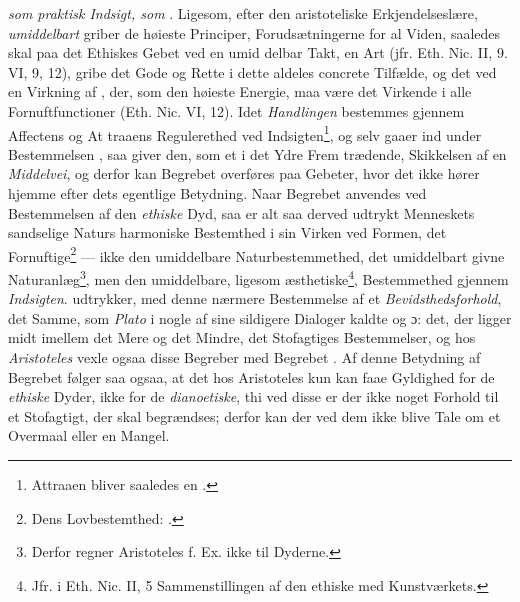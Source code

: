 \emph{} \emph{som praktisk Indsigt, som} \emph{}. Ligesom,
efter den aristoteliske Erkjendelseslære,  \emph{umiddelbart}
griber de høieste Principer, Forudsætningerne for al Viden,
saaledes skal paa det Ethiskes Gebet  ved en umid\-%
delbar Takt, en Art  (jfr. Eth. Nic. II, 9. VI, 9, 12),
gribe det Gode og Rette i dette aldeles concrete Tilfælde, og
det ved en Virkning af , der, som den høieste Energie,
maa være det Virkende i alle Fornuftfunctioner (Eth. Nic. VI,
12). Idet \emph{Handlingen} bestemmes gjennem Affectens og At\-%
traaens Regulerethed ved Indsigten\footnote{Attraaen bliver saaledes
en .}, og selv gaaer ind under
Bestemmelsen , saa giver den, som et i det Ydre Frem\-%
trædende,  Skikkelsen af en \emph{Middelvei}, og derfor
kan Begrebet  overføres paa Gebeter, hvor det ikke
hører hjemme efter dets egentlige Betydning. Naar Begrebet
anvendes ved Bestemmelsen af den \emph{ethiske} Dyd, saa er alt\-%
saa derved udtrykt Menneskets sandselige Naturs harmoniske
Bestemthed i sin Virken ved Formen, det Fornuftige\footnote{Dens
Lovbestemthed:  \emph{} .} --- ikke
den umiddelbare Naturbestemmethed, det umiddelbart givne
Naturanlæg\footnote{Derfor regner Aristoteles f. Ex. ikke
 til Dyderne.}, men den umiddelbare, ligesom æsthetiske\footnote{Jfr.
i Eth. Nic. II, 5 Sammenstillingen af den ethiske  med
Kunstværkets.},
Bestemmethed gjennem \emph{Indsigten}.  udtrykker, med
denne nærmere Bestemmelse af et \emph{Bevidsthedsforhold}, det
Samme, som \emph{Plato} i nogle af sine sildigere Dialoger kaldte
 og  ɔ: det, der ligger midt imellem det
Mere og det Mindre, det Stofagtiges Bestemmelser, og hos
\emph{Aristoteles} vexle ogsaa disse Begreber med Begrebet .
Af denne Betydning af Begrebet følger saa ogsaa, at det hos
Aristoteles kun kan faae Gyldighed for de \emph{ethiske} Dyder,
ikke for de \emph{dianoetiske}, thi ved disse er der ikke noget
Forhold til et Stofagtigt, der skal begrændses; derfor kan der
ved dem ikke blive Tale om et Overmaal eller en Mangel.

